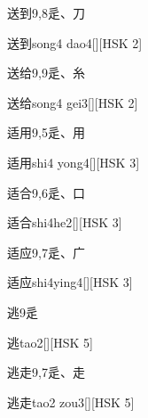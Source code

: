 \begin{entry}{送到}{9,8}{⾡、⼑}
  \begin{phonetics}{送到}{song4 dao4}[][HSK 2]
  \end{phonetics}
\end{entry}

\begin{entry}{送给}{9,9}{⾡、⽷}
  \begin{phonetics}{送给}{song4 gei3}[][HSK 2]
  \end{phonetics}
\end{entry}

\begin{entry}{适用}{9,5}{⾡、⽤}
  \begin{phonetics}{适用}{shi4 yong4}[][HSK 3]
  \end{phonetics}
\end{entry}

\begin{entry}{适合}{9,6}{⾡、⼝}
  \begin{phonetics}{适合}{shi4he2}[][HSK 3]
  \end{phonetics}
\end{entry}

\begin{entry}{适应}{9,7}{⾡、⼴}
  \begin{phonetics}{适应}{shi4ying4}[][HSK 3]
  \end{phonetics}
\end{entry}

\begin{entry}{逃}{9}{⾡}
  \begin{phonetics}{逃}{tao2}[][HSK 5]
  \end{phonetics}
\end{entry}

\begin{entry}{逃走}{9,7}{⾡、⾛}
  \begin{phonetics}{逃走}{tao2 zou3}[][HSK 5]
  \end{phonetics}
\end{entry}

